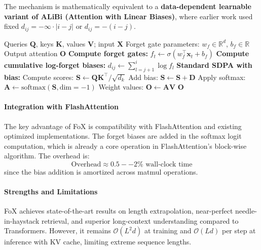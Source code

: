The mechanism is mathematically equivalent to a \textbf{data-dependent learnable variant of ALiBi (Attention with Linear Biases)}, where earlier work used fixed $d_{ij} = -\infty \cdot |i-j|$ or $d_{ij} = -(i-j)$.

\begin{algorithm}[H]
\caption{FoX: Forgetting Attention with Recency Bias}
\begin{algorithmic}[1]
\Require Queries $\mathbf{Q}$, keys $\mathbf{K}$, values $\mathbf{V}$; input $\mathbf{X}$
\Require Forget gate parameters: $w_f \in \mathbb{R}^d$, $b_f \in \mathbb{R}$
\Ensure Output attention $\mathbf{O}$
\State \textbf{Compute forget gates:}
    \State $f_t \gets \sigma(w_f^\top \mathbf{x}_t + b_f)$ 
\EndFor
\State \textbf{Compute cumulative log-forget biases:}
        \State $d_{ij} \gets \sum_{l=j+1}^{i} \log f_l$ 
    \EndFor
\EndFor
\State \textbf{Standard SDPA with bias:}
\State Compute scores: $\mathbf{S} \gets \mathbf{Q}\mathbf{K}^\top / \sqrt{d_k}$
\State Add bias: $\mathbf{S} \gets \mathbf{S} + \mathbf{D}$
\State Apply softmax: $\mathbf{A} \gets \text{softmax}(\mathbf{S}, \text{dim}=-1)$
\State Weight values: $\mathbf{O} \gets \mathbf{A} \mathbf{V}$
\Return $\mathbf{O}$
\end{algorithmic}
\end{algorithm}

\paragraph{Integration with FlashAttention}

The key advantage of FoX is compatibility with FlashAttention and existing optimized implementations. The forget biases are added in the softmax logit computation, which is already a core operation in FlashAttention's block-wise algorithm. The overhead is:
\[
\text{Overhead} \approx 0.5--2\% \text{ wall-clock time}
\]
since the bias addition is amortized across matmul operations.

\paragraph{Strengths and Limitations}

FoX achieves state-of-the-art results on length extrapolation, near-perfect needle-in-haystack retrieval, and superior long-context understanding compared to Transformers. However, it remains $\mathcal{O}(L^2 d)$ at training and $\mathcal{O}(L d)$ per step at inference with KV cache, limiting extreme sequence lengths.

